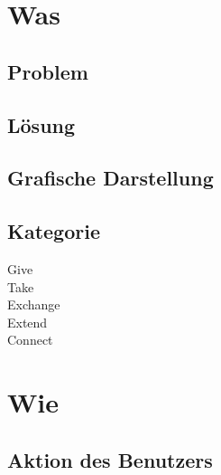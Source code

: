 \newcommand{\checkbox}[1]{
\ifx#1\undefined
  $\Box$
\else
  $\boxtimes$  
\fi}

\maketitle

\section*{Was}

\subsection*{Problem}
\desc

\subsection*{Lösung}
\solution

\subsection*{Grafische Darstellung}
\fig

\subsection*{Kategorie}
 Give \\
 Take \\
 Exchange \\
 Extend \\
 Connect



\section*{Wie}

\subsection*{Aktion des Benutzers}
\useraction

